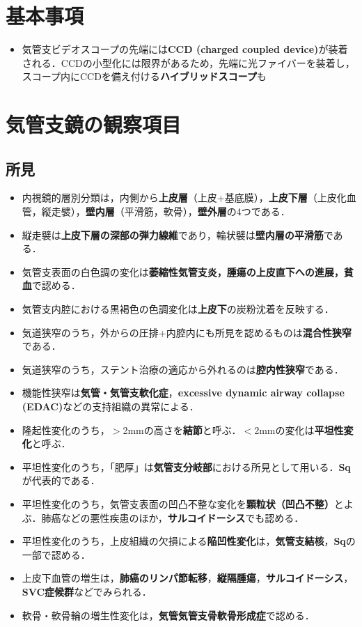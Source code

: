 
\section{基本事項}
\begin{itemize}
\item 気管支ビデオスコープの先端には\textbf{CCD (charged coupled device)}が装着される．CCDの小型化には限界があるため，先端に光ファイバーを装着し，スコープ内にCCDを備え付ける\textbf{ハイブリッドスコープ}も

\end{itemize}

\section{気管支鏡の観察項目}
\subsection{所見}
\begin{itemize}

\item 内視鏡的層別分類は，内側から\textbf{上皮層}（上皮+基底膜），\textbf{上皮下層}（上皮化血管，縦走襞），\textbf{壁内層}（平滑筋，軟骨），\textbf{壁外層}の4つである．

\item 縦走襞は\textbf{上皮下層の深部の弾力線維}であり，輪状襞は\textbf{壁内層の平滑筋}である．

\item 気管支表面の白色調の変化は\textbf{萎縮性気管支炎，腫瘍の上皮直下への進展，貧血}で認める．
\item 気管支内腔における黒褐色の色調変化は\textbf{上皮下}の炭粉沈着を反映する．
\item 気道狭窄のうち，外からの圧排+内腔内にも所見を認めるものは\textbf{混合性狭窄}である．
\item 気道狭窄のうち，ステント治療の適応から外れるのは\textbf{腔内性狭窄}である．
\item 機能性狭窄は\textbf{気管・気管支軟化症}，\textbf{excessive dynamic airway collapse (EDAC)}などの支持組織の異常による．

\item 隆起性変化のうち，$>$2mmの高さを\textbf{結節}と呼ぶ．$<$2mmの変化は\textbf{平坦性変化}と呼ぶ．
\item 平坦性変化のうち，「肥厚」は\textbf{気管支分岐部}における所見として用いる．\textbf{Sq}が代表的である．
\item 平坦性変化のうち，気管支表面の凹凸不整な変化を\textbf{顆粒状（凹凸不整）}とよぶ．肺癌などの悪性疾患のほか，\textbf{サルコイドーシス}でも認める．
\item 平坦性変化のうち，上皮組織の欠損による\textbf{陥凹性変化}は，\textbf{気管支結核}，\textbf{Sq}の一部で認める．

\item 上皮下血管の増生は，\textbf{肺癌のリンパ節転移}，\textbf{縦隔腫瘍}，\textbf{サルコイドーシス}，\textbf{SVC症候群}などでみられる．
\item 軟骨・軟骨輪の増生性変化は，\textbf{気管気管支骨軟骨形成症}で認める．

\end{itemize}
